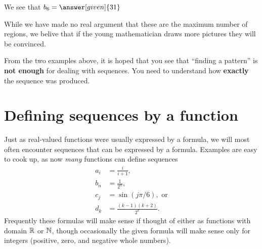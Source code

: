 \documentclass{ximera}
\begin{document}
\begin{example}
\begin{explanation}
\begin{itemize}
 We see that $b_6 = \answer[given]{31}$
    \end{itemize}
    While we have made no real argument that these are the maximum
    number of regions, we belive that if the young mathematician draws
    more pictures they will be convinced.
  \end{explanation}
\end{example}


From the two examples above, it is hoped that you see that ``finding a
pattern'' is \textbf{not enough} for dealing with sequences. You need
to understand how \textbf{exactly} the sequence was produced.




\section{Defining sequences by a function}

Just as real-valued functions were usually expressed by a formula, we
will most often encounter sequences that can be expressed by a
formula.  Examples are easy to cook up, as now \textit{many} functions
can define sequences
\begin{align*}
  a_i &=\frac{i}{i+1}, \\
  b_n &=\frac{1}{2^n}, \\
  c_j &=\sin(j\pi/6), \text{ or} \\
  d_k &=\frac{(k-1)(k+2)}{2^k}. 
\end{align*}
Frequently these formulas will make sense if thought of either as
functions with domain $\mathbb R$ or $\mathbb N$, though occasionally the given
formula will make sense only for integers (positive, zero, and
negative whole numbers).
\end{document}
